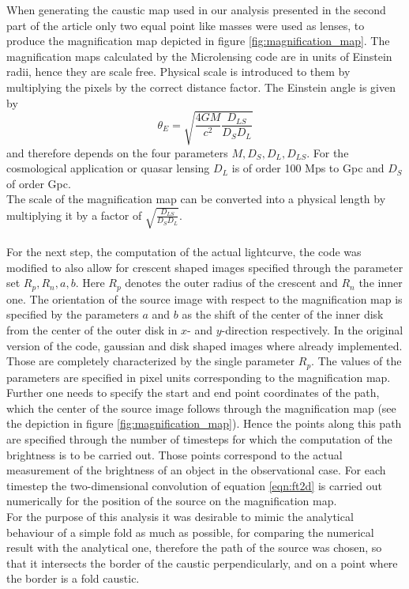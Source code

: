 When generating the caustic map used in our analysis presented in the second part of the article only two equal point like masses were used as lenses, to produce the magnification map depicted in figure \ref{fig:magnification_map}. The magnification maps calculated by the Microlensing code are in units of Einstein radii, hence they are scale free. Physical scale is introduced to them by multiplying the pixels by the correct distance factor. The Einstein angle is given by   
\begin{equation}
\theta_{E}=\sqrt{\frac{4GM}{c^{2}} \frac{D_{LS}}{D_{S}D_{L}}} 
\end{equation}  
and therefore depends on the four parameters $M,D_{S},D_{L},D_{LS}$. For the cosmological application or quasar lensing $D_{L}$ is of order 100 Mps to Gpc and $D_{S}$ of order Gpc.\\   
The scale of the magnification map can be converted into a physical length by multiplying it by a factor of $ \sqrt{\frac{D_{LS}}{D_{S}D_{L}}}$.\\\\
For the next step, the computation of the actual lightcurve, the code was modified to also allow for crescent shaped images specified through the parameter set $R_p,R_n,a,b$. Here $R_p$ denotes the outer radius of the crescent and $R_n$ the inner one. The orientation of the source image with respect to the magnification map is specified by the parameters $a$ and $b$ as the shift of the center of the inner disk from the center of the outer disk in $x$- and $y$-direction respectively. In the original version of the code, gaussian and disk shaped images where already implemented. Those are completely characterized by the single parameter $R_p$. The values of the parameters are specified in pixel units corresponding to the magnification map. Further one needs to specify the start and end point coordinates of the path, which the center of the source image follows through the magnification map (see the depiction in figure \ref{fig:magnification_map}). Hence the points along this path are specified through the number of timesteps for which the computation of the brightness is to be carried out. Those points correspond to the actual measurement of the brightness of an object in the observational case. For each timestep the two-dimensional convolution of equation \ref{eqn:ft2d} is carried out numerically for the position of the source on the magnification map. \\
For the purpose of this analysis it was desirable to mimic the analytical behaviour of a simple fold as much as possible, for comparing the numerical result with the analytical one, therefore the path of the source was chosen, so that it intersects the border of the caustic perpendicularly, and on a point where the border is a fold caustic.  
